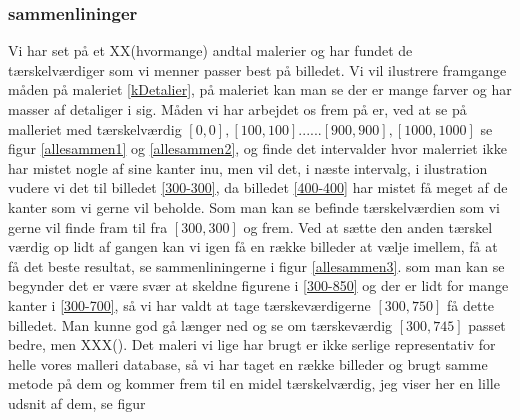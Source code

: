\subsubsection{sammenlininger}
Vi har set på et XX(hvormange) andtal malerier og har fundet de tærskelværdiger som vi menner passer best på billedet. Vi vil ilustrere framgange måden på maleriet \ref{kDetalier}, på maleriet kan man se der er mange farver og har masser af detaliger i sig. Måden vi har arbejdet os frem på er, ved at se på malleriet med tærskelværdig $[0,0],[100,100]......[900,900],[1000,1000]$ se figur \ref{allesammen1} og \ref{allesammen2}, og finde det intervalder hvor malerriet ikke har mistet nogle af sine kanter inu, men vil det, i næste intervalg, i ilustration vudere vi det til billedet \ref{300-300}, da billedet \ref{400-400} har mistet få meget af de kanter som vi gerne vil beholde. Som man kan se befinde tærskelværdien som vi gerne vil finde fram til fra $[300,300]$ og frem. Ved at sætte den anden tærskel værdig op lidt af gangen kan vi igen få en række billeder at vælje imellem, få at få det beste resultat, se sammenliningerne i figur \ref{allesammen3}. som man kan se begynder det er være svær at skeldne figurene i \ref{300-850} og der er lidt for mange kanter i \ref{300-700}, så vi har valdt at tage tærskeværdigerne $[300,750]$ få dette billedet. Man kunne god gå længer ned og se om tærskeværdig $[300,745]$ passet bedre, men XXX(). Det maleri vi lige har brugt er ikke serlige representativ for helle vores malleri database, så vi har taget en række billeder og brugt samme metode på dem og kommer frem til en midel tærskelværdig, jeg viser her en lille udsnit af dem, se figur %
